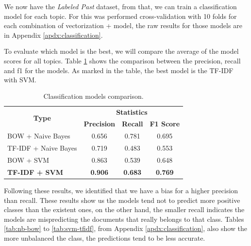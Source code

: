 
We now have the \textit{Labeled Past} dataset, from that, we can train a classification model for each topic. For this was performed cross-validation with 10 folds for each combination of vectorization + model, the raw results for those models are in Appendix \ref{apdx:classification}.


To evaluate which model is the best, we will compare the average of the model scores for all topics. Table \ref{tab:classification-report} shows the comparison between the precision, recall and f1 for the models.
As marked in the table, the best model is the TF-IDF with SVM.

\begin{table}[h!]
	\centering
	\caption{Classification models comparison.}
	\label{tab:classification-report}
	\begin{tabular}{c|ccc}
		\toprule
		\multirow{2}{*}{\textbf{Type}} & \multicolumn{3}{c}{\textbf{Statistics}} \\\cmidrule{2-4}
		 & \textbf{Precision} & \textbf{Recall} & \textbf{F1 Score} \\ \midrule
		\multicolumn{1}{l|}{BOW + Naive Bayes}     & 0.656 & 0.781 & 0.695 \\
		\multicolumn{1}{l|}{TF-IDF + Naive Bayes}  & 0.719 & 0.483 & 0.553 \\
		\multicolumn{1}{l|}{BOW + SVM}             & 0.863 & 0.539 & 0.648 \\
		\multicolumn{1}{l|}{\textbf{TF-IDF + SVM}} & \textbf{0.906} & \textbf{0.683} & \textbf{0.769} \\
		\bottomrule
	\end{tabular}
\end{table}

Following these results, we identified that we have a bias for a higher precision than recall. These results show us the models tend not to predict more positive classes than the existent ones, on the other hand, the smaller recall indicates the models are mispredicting the documents that really belongs to that class. Tables \ref{tab:nb-bow} to \ref{tab:svm-tfidf}, from Appendix \ref{apdx:classification}, also show the more unbalanced the class, the predictions tend to be less accurate.


